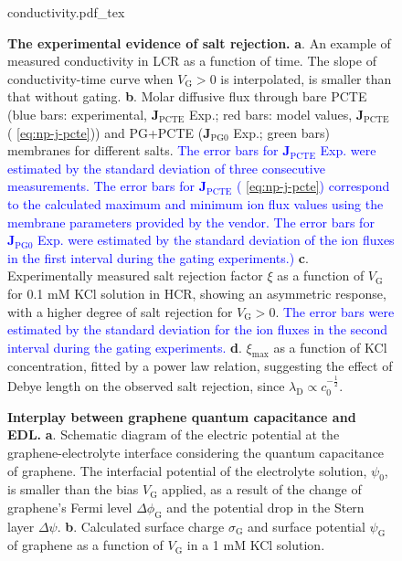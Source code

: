\begin{figure}[H]
  \centering
   {conductivity.pdf_tex}
  \caption{ \textbf{The experimental evidence of salt rejection.}
    \textbf{a}. An example of measured conductivity in LCR as a
    function of time. The slope of conductivity-time curve when
    $V_{\mathrm{G}}>0$ is interpolated, is smaller than that without
    gating. \textbf{b}. Molar diffusive flux through bare PCTE (blue
    bars: experimental, $\symbf{J}_{\mathrm{PCTE}}$ Exp.; red
    bars: model values, $\symbf{J}_{\mathrm{PCTE}}$
    ( \autoref{eq:np-j-pcte})) and PG+PCTE
    ($\symbf{J}_{\mathrm{PG0}}$ Exp.; green bars) membranes for
    different salts. \textcolor{blue}{The error bars for
      $\symbf{J}_{\mathrm{PCTE}}$ Exp. were estimated by the
      standard deviation of three consecutive measurements. The error bars
      for $\symbf{J}_{\mathrm{PCTE}}$ ( \autoref{eq:np-j-pcte})
      correspond to the calculated maximum and minimum ion flux values
      using the membrane parameters provided by the vendor. The error
      bars for $\symbf{J}_{\mathrm{PG0}}$ Exp. were estimated by
      the standard deviation of the ion fluxes in the first interval
      during the gating experiments.)}  \textbf{c}. Experimentally
    measured salt rejection factor $\xi$ as a function of
    $V_{\mathrm{G}}$ for 0.1 mM KCl solution in HCR, showing an
    asymmetric response, with a higher degree of salt rejection for
    $V_{\mathrm{G}}>0$. \textcolor{blue}{The error bars were estimated
      by the standard deviation for the ion fluxes in the second
      interval during the gating experiments.}
    \textbf{d}. $\xi_{\mathrm{max}}$ as a function of KCl
    concentration, fitted by a power law relation, suggesting the
    effect of Debye length on the observed salt rejection, since
    $\lambda_{\mathrm{D}} \propto c_{0}^{-\frac{1}{2}}$.}
  \label{fig:np-2} 
\end{figure}

\begin{figure}[H]
  \centering
  \caption{\textbf{Interplay between graphene quantum capacitance and
      EDL.} \textbf{a}. Schematic diagram of the electric
    potential at the graphene-electrolyte interface considering the
    quantum capacitance of graphene. The interfacial potential of the
    electrolyte solution, $\psi_{0}$, is smaller than the bias
    $V_{\mathrm{G}}$ applied, as a result of the change of graphene's
    Fermi level $\Delta \phi_{\mathrm{G}}$ and the potential drop in
    the Stern layer $\Delta \psi$. \textbf{b}. Calculated surface
    charge $\sigma_{\mathrm{G}}$ and surface potential
    $\psi_{\mathrm{G}}$ of graphene as a function of $V_{\mathrm{G}}$
    in a 1 mM KCl solution. }
  \label{fig:np-3}
\end{figure}


